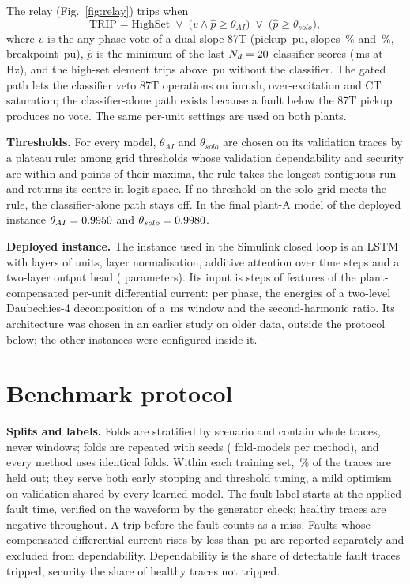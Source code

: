 \documentclass[preprint,12pt]{elsarticle}
\begin{document}
The relay (Fig.~\ref{fig:relay}) trips when
\begin{equation}
\text{TRIP}=\text{HighSet}\;\vee\;\big(v\wedge \hat p\ge\theta_{AI}\big)\;\vee\;\big(\hat p\ge\theta_{solo}\big),
\label{eq:trip}
\end{equation}
where $v$ is the any-phase vote of a dual-slope 87T (pickup \pickup\,pu, slopes \slopeOne\,\% and \slopeTwo\,\%, breakpoint \breakpoint\,pu), $\hat p$ is the minimum of the last $N_d=20$ classifier scores (\dwellMs\,ms at \fs\,Hz), and the high-set element trips above \highset\,pu without the classifier. The gated path lets the classifier veto 87T operations on inrush, over-excitation and CT saturation; the classifier-alone path exists because a fault below the 87T pickup produces no vote. The same per-unit settings are used on both plants.

\textbf{Thresholds.} For every model, $\theta_{AI}$ and $\theta_{solo}$ are chosen on its validation traces by a plateau rule: among grid thresholds whose validation dependability and security are within \depTol{} and \secTol{} points of their maxima, the rule takes the longest contiguous run and returns its centre in logit space. If no threshold on the solo grid meets the rule, the classifier-alone path stays off. In the final plant-A model of the deployed instance $\theta_{AI}=0.9950$ and $\theta_{solo}=0.9980$.

\textbf{Deployed instance.} The instance used in the Simulink closed loop is an LSTM \citep{hochreiter1997} with \layers{} layers of \hidden{} units, layer normalisation, additive attention over \seq{} time steps and a two-layer output head (\nParams{} parameters). Its input is \seq{} steps of \nFeat{} features of the plant-compensated per-unit differential current: per phase, the energies of a two-level Daubechies-4 decomposition \citep{mallat1989} of a \winMs\,ms window and the second-harmonic ratio. Its architecture was chosen in an earlier study on older data, outside the protocol below; the other instances were configured inside it.

\section{Benchmark protocol}
\label{sec:protocol}
\textbf{Splits and labels.} Folds are stratified by scenario and contain whole traces, never windows; \nFolds{} folds are repeated with \nSeeds{} seeds (\nFoldModels{} fold-models per method), and every method uses identical folds. Within each training set, \valShare\,\% of the traces are held out; they serve both early stopping and threshold tuning, a mild optimism on validation shared by every learned model. The fault label starts at the applied fault time, verified on the waveform by the generator check; healthy traces are negative throughout. A trip before the fault counts as a miss. Faults whose compensated differential current rises by less than \minFaultPu\,pu are reported separately and excluded from dependability. Dependability is the share of detectable fault traces tripped, security the share of healthy traces not tripped.
\end{document}
